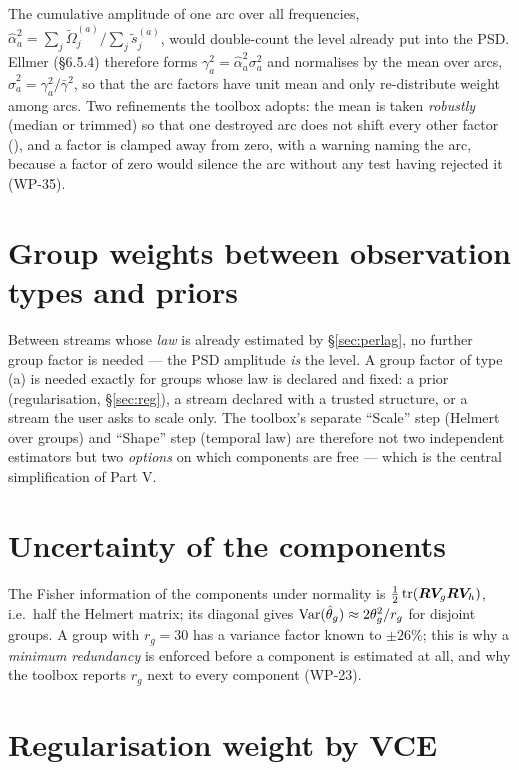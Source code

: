The cumulative amplitude of one arc over all frequencies, $\hat\alpha_a^2 = \sum_j\tilde\Omega_j^{(a)}/\sum_j\tilde s_j^{(a)}$, would double-count the level already put into the PSD. Ellmer (§6.5.4) therefore forms $\gamma_a^2 = \hat\alpha_a^2\sigma_a^2$ and normalises by the mean over arcs, $\hat\sigma_a^2 = \gamma_a^2/\bar\gamma^2$, so that the arc factors have unit mean and only re-distribute weight among arcs. Two refinements the toolbox adopts: the mean is taken \emph{robustly} (median or trimmed) so that one destroyed arc does not shift every other factor (), and a factor is clamped away from zero, with a warning naming the arc, because a factor of zero would silence the arc without any test having rejected it (WP-35).

\section{Group weights between observation types and priors}

Between streams whose \emph{law} is already estimated by \S\ref{sec:perlag}, no further group factor is needed --- the PSD amplitude \emph{is} the level. A group factor of type (a) is needed exactly for groups whose law is declared and fixed: a prior (regularisation, \S\ref{sec:reg}), a stream declared  with a trusted structure, or a stream the user asks to scale only. The toolbox's separate ``Scale'' step (Helmert over  groups) and ``Shape'' step (temporal law) are therefore not two independent estimators but two \emph{options} on which components are free --- which is the central simplification of Part V.

\section{Uncertainty of the components}

The Fisher information of the components under normality is $\frac12\operatorname{tr}(\bm{R}\bm{V}_g\bm{R}\bm{V}_h)$, i.e.\ half the Helmert matrix; its diagonal gives $\operatorname{Var}(\hat\theta_g) \approx 2\theta_g^2/r_g$ for disjoint groups. A group with $r_g = 30$ has a variance factor known to $\pm 26\%$; this is why a \emph{minimum redundancy} is enforced before a component is estimated at all, and why the toolbox reports $r_g$ next to every component (WP-23).

\section{Regularisation weight by VCE}

